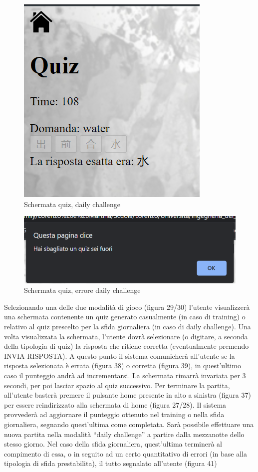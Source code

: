 \begin{figure}[!h]
\centering
\includegraphics[scale=0.70]{images/dailyChallengeCorretta.png}
\caption{Schermata quiz, daily challenge}
\label{fig:user_flow_guest}
\end{figure}
\noindent


\begin{figure}[!h]
\centering
\includegraphics[scale=0.70]{images/dailyChallengeErrore.png}
\caption{Schermata quiz, errore daily challenge}
\label{fig:user_flow_guest}
\end{figure}
\noindent


Selezionando una delle due modalità di gioco (figura 29/30) l’utente visualizzerà una schermata contenente un quiz generato casualmente (in caso di training) o relativo al quiz prescelto per la sfida giornaliera (in caso di daily challenge).
Una volta visualizzata la schermata, l’utente dovrà selezionare (o digitare, a seconda della tipologia di quiz) la risposta che ritiene corretta (eventualmente premendo INVIA RISPOSTA).
A questo punto il sistema comunicherà all’utente se la risposta selezionata è errata (figura 38) o corretta (figura 39), in quest’ultimo caso il punteggio andrà ad incrementarsi. La schermata rimarrà invariata per 3 secondi, per poi lasciar spazio al quiz successivo.
Per terminare la partita, all’utente basterà premere il pulsante home presente in alto a sinistra (figura 37) per essere reindirizzato alla schermata di home (figura 27/28). Il sistema provvederà ad aggiornare il punteggio ottenuto nel training o nella sfida giornaliera, segnando quest’ultima come completata. Sarà possibile effettuare una nuova partita nella modalità “daily challenge” a partire dalla mezzanotte dello stesso giorno.
Nel caso della sfida giornaliera, quest’ultima terminerà al compimento di essa, o in seguito ad un certo quantitativo di errori (in base alla tipologia di sfida prestabilita), il tutto segnalato all’utente (figura 41)
